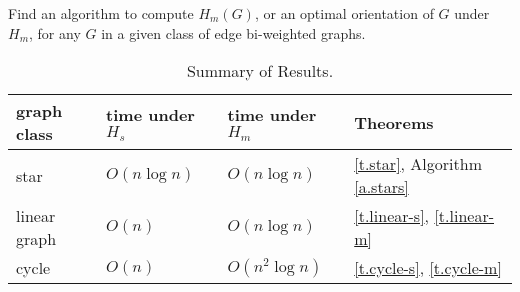 \begin{problem}
Find an algorithm to compute
$H_m(G) $, or an optimal orientation of $G$ under $H_m$,
for any $G$ in a given class of edge bi-weighted graphs.
\end{problem}

\begin{table*}[h!]
	\begin{center}
		\caption{Summary of Results.}
		\label{tbl:summary}
		\begin{tabular}{|l|l|l|l|}
			\hline
			graph class & time under $H_s$ & time under $H_m$  & Theorems  \\
			\hline
			star            &        $O(n \log n)$  & $O(n \log n)$        & \ref{t.star}, Algorithm \ref{a.stars}		\\
						\hline
			linear graph & $O(n)$        		&$O(n \log n)$ 	& \ref{t.linear-s}, \ref{t.linear-m} \\
						\hline
			cycle 		 & $O(n)$ 		& $O(n^2 \log n)$ 		&  \ref{t.cycle-s}, \ref{t.cycle-m} \\

			\hline
		\end{tabular}
	\end{center}
\end{table*}
